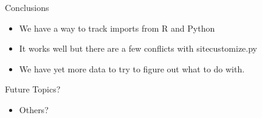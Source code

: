 \documentclass{beamer}
\begin{document}
\begin{frame}{Conclusions}
  \begin{itemize}
    \item We have a way to track imports from R and Python
    \item It works well but there are a few conflicts with
      sitecustomize.py
    \item We have yet more data to try to figure out what to do with.
  \end{itemize}
\end{frame}


\begin{frame}{Future Topics?}
  \begin{itemize}
    \item Others?
  \end{itemize}
\end{frame}
%

%
\end{document}
